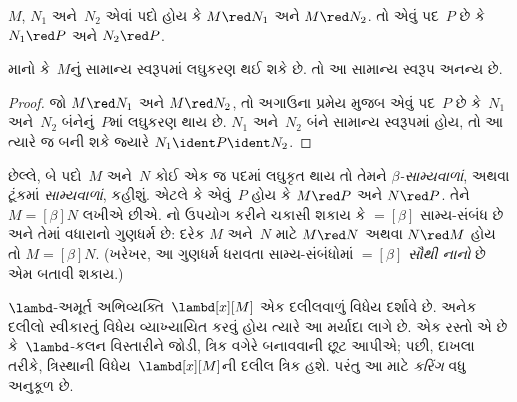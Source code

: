 \begingroup
\makeatletter{}\makeatother

\label{guunit:OLP-0346}


\begin{thm}
$M$, $N_1$ અને~$N_2$ એવાં પદો હોય કે $M \red N_1$ અને $M \red
N_2$. તો એવું પદ~$P$ છે કે $N_1 \red P$ અને $N_2 \red P$.
\end{thm}

\begin{cor}
માનો કે~$M$નું સામાન્ય સ્વરૂપમાં લઘુકરણ થઈ શકે છે. તો આ
સામાન્ય સ્વરૂપ અનન્ય છે.
\end{cor}

\begin{proof}
જો $M \red N_1$ અને $M \red N_2$, તો અગાઉના પ્રમેય મુજબ એવું
પદ~$P$ છે કે~$N_1$ અને~$N_2$ બંનેનું~$P$માં લઘુકરણ થાય છે.
$N_1$ અને~$N_2$ બંને સામાન્ય સ્વરૂપમાં હોય, તો આ ત્યારે જ બની
શકે જ્યારે $N_1 \ident P \ident N_2$.
\end{proof}

છેલ્લે, બે પદો~$M$ અને~$N$ કોઈ એક જ પદમાં લઘુકૃત થાય તો તેમને
\emph{$\beta$-સામ્યવાળાં}, અથવા ટૂંકમાં \emph{સામ્યવાળાં},
કહીશું. એટલે કે એવું~$P$ હોય કે $M \red P$ અને $N \red P$.
તેને $M \equal[\beta] N$ લખીએ છીએ. 
નો ઉપયોગ કરીને ચકાસી શકાય કે
$\equal[\beta]$ સામ્ય-સંબંધ છે અને તેમાં વધારાનો ગુણધર્મ છે:
દરેક $M$ અને~$N$ માટે $M \red N$ અથવા $N \red M$ હોય તો
$M \equal[\beta] N$. (ખરેખર, આ ગુણધર્મ ધરાવતા સામ્ય-સંબંધોમાં
$\equal[\beta]$ \emph{સૌથી નાનો} છે એમ બતાવી શકાય.)
\endgroup


\begingroup
\makeatletter{}\makeatother

\label{guunit:OLP-0347}


$\lambd$-અમૂર્ત અભિવ્યક્તિ~$\lambd[x][M]$ એક દલીલવાળું
વિધેય દર્શાવે છે. અનેક દલીલો સ્વીકારતું વિધેય વ્યાખ્યાયિત કરવું
હોય ત્યારે આ મર્યાદા લાગે છે. એક રસ્તો એ છે કે~$\lambd$-કલન
વિસ્તારીને જોડી, ત્રિક વગેરે બનાવવાની છૂટ આપીએ; પછી, દાખલા
તરીકે, ત્રિસ્થાની વિધેય~$\lambd[x][M]$ની દલીલ ત્રિક હશે.
પરંતુ આ માટે \emph{કરિંગ} વધુ અનુકૂળ છે.

